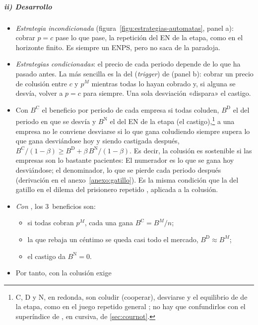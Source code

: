 \documentclass[11pt]{article}
\begin{document}
\subparagraph{ii) Desarrollo}

\begin{itemize}
\item \emph{Estrategia incondicionada} (figura~\ref{figu:estrategias-automatas}, panel a): cobrar $p=c$ pase lo que pase, la repetición del EN de la etapa, como en el horizonte finito. Es siempre un ENPS, pero no saca de la paradoja.
\item \emph{Estrategias condicionadas}: el precio de cada periodo depende de lo que ha pasado antes. La más sencilla es la del  (\emph{trigger}) de \textcite{Friedman1971Supergames} (panel b): cobrar un precio de colusión entre $c$ y $p^M$ mientras todas lo hayan cobrado y, si alguna se desvía, volver a $p=c$ para siempre. Una sola desviación «dispara» el castigo.
\item Con $B^{\mathrm C}$ el beneficio por periodo de cada empresa si todas coluden, $B^{\mathrm D}$ el del periodo en que se desvía y $B^{\mathrm N}$ el del EN de la etapa (el castigo),\footnote{C, D y N, en redonda, son coludir (cooperar), desviarse y el equilibrio de  de la etapa, como en el juego repetido general ; no hay que confundirlos con el superíndice de , en cursiva, de \ref{sec:cournot}.} a una empresa no le conviene desviarse si lo que gana coludiendo siempre supera lo que gana desviándose hoy y siendo castigada después, $B^{\mathrm C}/(1-\beta)\geq B^{\mathrm D}+\beta\,B^{\mathrm N}/(1-\beta)$. Es decir, la colusión es sostenible si las empresas son lo bastante pacientes:
  El numerador es lo que se gana hoy desviándose; el denominador, lo que se pierde cada periodo después (derivación en el anexo~\ref{anexo:gatillo}). Es la misma condición que la del gatillo en el dilema del prisionero repetido , aplicada a la colusión.
\item \emph{Con }, los 3~beneficios son:
  \begin{itemize}
  \item si todas cobran $p^M$, cada una gana $B^{\mathrm C}=B^M/n$;
  \item la que rebaja un céntimo se queda casi todo el mercado, $B^{\mathrm D}\approx B^M$;
  \item el castigo da $B^{\mathrm N}=0$.
  \end{itemize}
\item Por tanto, con  la colusión exige

\end{itemize}
\end{document}
